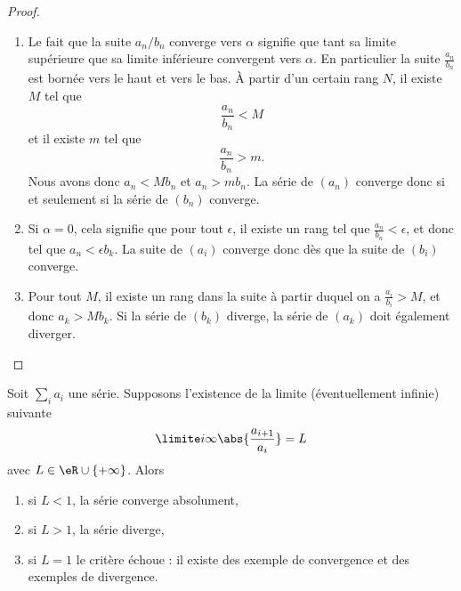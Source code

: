 \begin{proof}
\begin{enumerate}
    \item
        Le fait que la suite $a_n/b_n$ converge vers $\alpha$ signifie que tant sa limite supérieure que sa limite inférieure convergent vers $\alpha$. En particulier la suite $\frac{ a_n }{ b_n }$ est bornée vers le haut et vers le bas. À partir d'un certain rang $N$, il existe $M$ tel que 
        \begin{equation}
            \frac{ a_n }{ b_n }<M
        \end{equation}
        et il existe $m$ tel que
        \begin{equation}
            \frac{ a_n }{ b_n }>m.
        \end{equation}
        Nous avons donc $a_n<Mb_n$ et $a_n>mb_n$. La série de $(a_n)$ converge donc si et seulement si la série de $(b_n)$ converge.
    \item
        Si $\alpha=0$, cela signifie que pour tout $\epsilon$, il existe un rang tel que $\frac{ a_n }{ b_n }<\epsilon$, et donc tel que $a_n<\epsilon b_k$. La suite de $(a_i)$ converge donc dès que la suite de $(b_i)$ converge.
    \item
        Pour tout $M$, il existe un rang dans la suite à partir duquel on a $\frac{ a_i }{ b_i }>M$, et donc $a_k>Mb_k$. Si la série de $(b_k)$ diverge, la série de $(a_k)$ doit également diverger.
\end{enumerate}
\end{proof}


\begin{proposition}     \label{PropOXKUooQmAaJX}
    Soit $\sum_i a_i$ une série. Supposons l'existence de la limite (éventuellement infinie) suivante
    \begin{equation}
      \limite i \infty \abs{\frac{a_{i+1}}{a_i}} = L
    \end{equation}
    avec \( L\in \eR\cup\{ +\infty \}\).  Alors
    \begin{enumerate}
    \item si $L < 1$, la série converge absolument,
    \item si $L > 1$, la série diverge,
    \item si $L = 1$ le critère échoue : il existe des exemple de convergence et des exemples de divergence.
    \end{enumerate}
\end{proposition}

